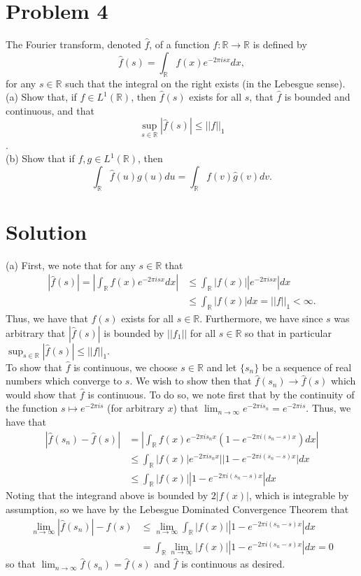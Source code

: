 \documentclass{article}
\begin{document}
\section*{Problem 4}
The Fourier transform, denoted $\hat{f}$, of a function $f:\mathbb{R}\rightarrow\mathbb{R}$ is defined by $$\hat{f}(s)=\int_\mathbb{R}f(x)e^{-2\pi isx}dx,$$ for any $s\in\mathbb{R}$ such that the integral on the right exists (in the Lebesgue sense).\\

\noindent (a) Show that, if $f\in L^1(\mathbb{R})$, then $\hat{f}(s)$ exists for all $s$, that $\hat{f}$ is bounded and continuous, and that $$\sup_{s\in\mathbb{R}}|\hat{f}(s)|\leq||f||_1$$.\\

\noindent (b) Show that if $f,g\in L^1(\mathbb{R})$, then $$\int_\mathbb{R}\hat{f}(u)g(u)du=\int_\mathbb{R}f(v)\hat{g}(v)dv.$$

\section*{Solution}
(a) First, we note that for any $s\in\mathbb{R}$ that
\begin{align*}
|\hat{f}(s)|=\left|\int_\mathbb{R}f(x)e^{-2\pi isx}dx\right|&\leq\int_\mathbb{R}|f(x)||e^{-2\pi isx}|dx\\
&\leq\int_\mathbb{R}|f(x)|dx=||f||_1<\infty.
\end{align*}
Thus, we have that $\hat{f}(s)$ exists for all $s\in\mathbb{R}$.  Furthermore, we have since $s$ was arbitrary that $|\hat{f}(s)|$ is bounded by $||f_1||$ for all $s\in\mathbb{R}$ so that in particular $\sup_{s\in\mathbb{R}}|\hat{f}(s)|\leq||f||_1$.\\

\noindent To show that $\hat{f}$ is continuous, we choose $s\in\mathbb{R}$ and let $\{s_n\}$ be a sequence of real numbers which converge to $s$.  We wish to show then that $\hat{f}(s_n)\rightarrow\hat{f}(s)$ which would show that $\hat{f}$ is continuous.  To do so, we note first that by the continuity of the function $s\mapsto e^{-2\pi is}$ (for arbitrary $x$) that $\lim_{n\rightarrow\infty}e^{-2\pi i s_n}=e^{-2\pi is}$.  Thus, we have that
\begin{align*}
|\hat{f}(s_n)-\hat{f}(s)|&=\left|\int_\mathbb{R}f(x)e^{-2\pi is_nx}\left(1-e^{-2\pi i(s_n-s)x}\right)dx\right|\\
&\leq\int_\mathbb{R}|f(x)|e^{-2\pi is_nx}||1-e^{-2\pi i(s_n-s)x}|dx\\
&\leq\int_\mathbb{R}|f(x)||1-e^{-2\pi i(s_n-s)x}|dx
\end{align*}
Noting that the integrand above is bounded by $2|f(x)|$, which is integrable by assumption, so we have by the Lebesgue Dominated Convergence Theorem that
\begin{align*}
\lim_{n\rightarrow\infty}|\hat{f}(s_n)|-\hat{f}(s)&\leq\lim_{n\rightarrow\infty}\int_\mathbb{R}|f(x)||1-e^{-2\pi i(s_n-s)x}|dx\\
&=\int_\mathbb{R}\lim_{n\rightarrow\infty}|f(x)||1-e^{-2\pi i(s_n-s)x}|dx=0
\end{align*}
so that $\lim_{n\rightarrow\infty}\hat{f}(s_n)=\hat{f}(s)$ and $\hat{f}$ is continuous as desired.\\
\end{document}
